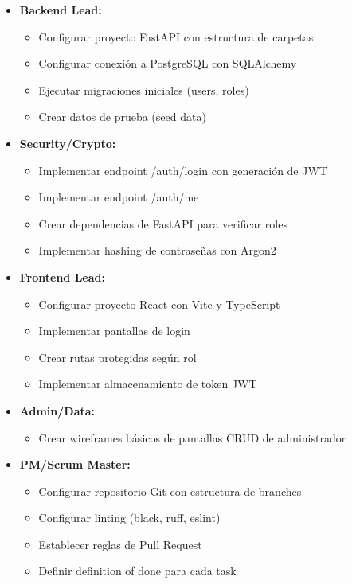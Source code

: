 \documentclass[12pt,a4paper]{article}
\begin{document}
\begin{itemize}[leftmargin=*]
    \item \textbf{Backend Lead:}
    \begin{itemize}
        \item Configurar proyecto FastAPI con estructura de carpetas
        \item Configurar conexión a PostgreSQL con SQLAlchemy
        \item Ejecutar migraciones iniciales (users, roles)
        \item Crear datos de prueba (seed data)
    \end{itemize}
    
    \item \textbf{Security/Crypto:}
    \begin{itemize}
        \item Implementar endpoint /auth/login con generación de JWT
        \item Implementar endpoint /auth/me
        \item Crear dependencias de FastAPI para verificar roles
        \item Implementar hashing de contraseñas con Argon2
    \end{itemize}
    
    \item \textbf{Frontend Lead:}
    \begin{itemize}
        \item Configurar proyecto React con Vite y TypeScript
        \item Implementar pantallas de login
        \item Crear rutas protegidas según rol
        \item Implementar almacenamiento de token JWT
    \end{itemize}
    
    \item \textbf{Admin/Data:}
    \begin{itemize}
        \item Crear wireframes básicos de pantallas CRUD de administrador
    \end{itemize}
    
    \item \textbf{PM/Scrum Master:}
    \begin{itemize}
        \item Configurar repositorio Git con estructura de branches
        \item Configurar linting (black, ruff, eslint)
        \item Establecer reglas de Pull Request
        \item Definir definition of done para cada task
    \end{itemize}
\end{itemize}
\end{document}
